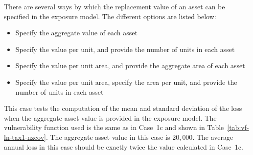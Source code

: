 There are several ways by which the replacement value of an asset can be specified in the exposure model. The different options are listed below:

\begin{itemize}
	\item Specify the aggregate value of each asset
	\item Specify the value per unit, and provide the number of units in each asset
	\item Specify the value per unit area, and provide the aggregate area of each asset
	\item Specify the value per unit area, specify the area per unit, and provide the number of units in each asset
\end{itemize}

This case tests the computation of the mean and standard deviation of the loss when the aggregate asset value is provided in the exposure model. The vulnerability function used is the same as in Case~1c and shown in Table~\ref{tab:vf-ln-tax1-nzcov}. The aggregate asset value in this case is $20,000$. The average annual loss in this case should be exactly twice the value calculated in Case~1c.